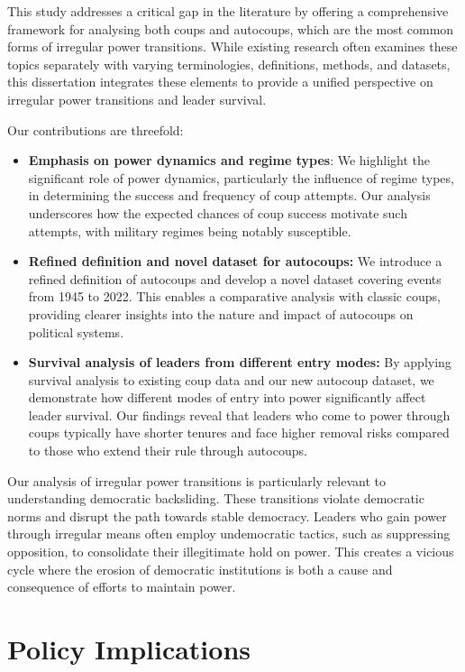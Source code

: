 \documentclass[
  12pt,
]{report}
\begin{document}
This study addresses a critical gap in the literature by offering a
comprehensive framework for analysing both coups and autocoups, which
are the most common forms of irregular power transitions. While existing
research often examines these topics separately with varying
terminologies, definitions, methods, and datasets, this dissertation
integrates these elements to provide a unified perspective on irregular
power transitions and leader survival.

Our contributions are threefold:

\begin{itemize}
\item
  \textbf{Emphasis on power dynamics and regime types}: We highlight the
  significant role of power dynamics, particularly the influence of
  regime types, in determining the success and frequency of coup
  attempts. Our analysis underscores how the expected chances of coup
  success motivate such attempts, with military regimes being notably
  susceptible.
\item
  \textbf{Refined definition and novel dataset for autocoups:} We
  introduce a refined definition of autocoups and develop a novel
  dataset covering events from 1945 to 2022. This enables a comparative
  analysis with classic coups, providing clearer insights into the
  nature and impact of autocoups on political systems.
\item
  \textbf{Survival analysis of leaders from different entry modes:} By
  applying survival analysis to existing coup data and our new autocoup
  dataset, we demonstrate how different modes of entry into power
  significantly affect leader survival. Our findings reveal that leaders
  who come to power through coups typically have shorter tenures and
  face higher removal risks compared to those who extend their rule
  through autocoups.
\end{itemize}

Our analysis of irregular power transitions is particularly relevant to
understanding democratic backsliding. These transitions violate
democratic norms and disrupt the path towards stable democracy. Leaders
who gain power through irregular means often employ undemocratic
tactics, such as suppressing opposition, to consolidate their
illegitimate hold on power. This creates a vicious cycle where the
erosion of democratic institutions is both a cause and consequence of
efforts to maintain power.

\section{Policy Implications}\label{policy-implications}
\end{document}
